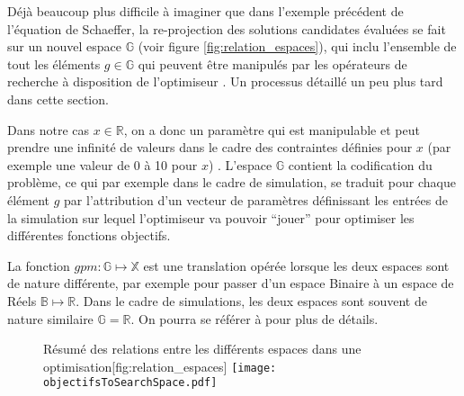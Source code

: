 Déjà beaucoup plus difficile à imaginer que dans l'exemple précédent de l'équation de Schaeffer, la re-projection des solutions candidates évaluées se fait sur un nouvel espace $\mathbb{G}$ (voir figure \ref{fig:relation_espaces}), qui inclu l'ensemble de tout les éléments $g \in \mathbb{G}$ qui peuvent être manipulés par les opérateurs de recherche à disposition de l'optimiseur \autocite[82]{Weise2011}. Un processus détaillé un peu plus tard dans cette section.

Dans notre cas $x \in \mathbb{R}$, on a donc un paramètre qui est manipulable et peut prendre une infinité de valeurs dans le cadre des contraintes définies pour $x$ (par exemple une valeur de 0 à 10 pour $x$) . L'espace $\mathbb{G}$ contient la codification du problème, ce qui par exemple dans le cadre de simulation, se traduit pour chaque élément $g$ par l'attribution d'un vecteur de paramètres définissant les entrées de la simulation sur lequel l'optimiseur va pouvoir \enquote{jouer} pour optimiser les différentes fonctions objectifs.

La fonction $gpm : \mathbb{G} \mapsto \mathbb{X}$ est une translation opérée lorsque les deux espaces sont de nature différente, par exemple pour passer d'un espace Binaire à un espace de Réels $\mathbb{B} \mapsto \mathbb{R}$. Dans le cadre de simulations, les deux espaces sont souvent de nature similaire $\mathbb{G} = \mathbb{R}$. On pourra se référer à \textcite[86-88]{Weise2011} pour plus de détails.

\begin{figure}[!htbp]
	\begin{sidecaption}[fortoc]{Résumé des relations entre les différents espaces dans une optimisation}[fig:relation_espaces]
		\centering
		\texttt{[image: objectifsToSearchSpace.pdf]}
  \end{sidecaption}
\end{figure}


